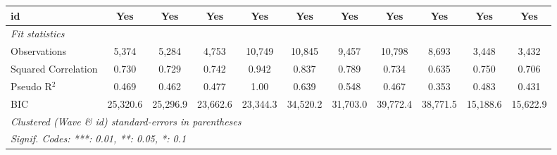 \begin{table}[htbp]
\begin{tabular}{lcccccccccc}
      id                             & Yes            & Yes              & Yes        & Yes           & Yes          & Yes           & Yes         & Yes           & Yes         & Yes\\  
      \midrule
      \emph{Fit statistics}\\
      Observations                   & 5,374          & 5,284            & 4,753      & 10,749        & 10,845       & 9,457         & 10,798      & 8,693         & 3,448       & 3,432\\  
      Squared Correlation            & 0.730          & 0.729            & 0.742      & 0.942         & 0.837        & 0.789         & 0.734       & 0.635         & 0.750       & 0.706\\  
      Pseudo R$^2$                   & 0.469          & 0.462            & 0.477      & 1.00          & 0.639        & 0.548         & 0.467       & 0.353         & 0.483       & 0.431\\  
      BIC                            & 25,320.6       & 25,296.9         & 23,662.6   & 23,344.3      & 34,520.2     & 31,703.0      & 39,772.4    & 38,771.5      & 15,188.6    & 15,622.9\\  
      \midrule \midrule
      \multicolumn{11}{l}{\emph{Clustered (Wave \& id) standard-errors in parentheses}}\\
      \multicolumn{11}{l}{\emph{Signif. Codes: ***: 0.01, **: 0.05, *: 0.1}}\\
   \end{tabular}
\end{table}


